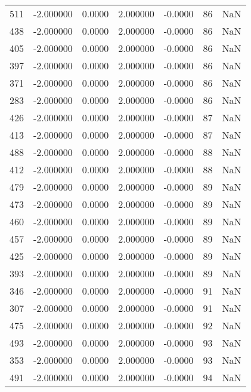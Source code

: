 \begin{tabular}{rrrrrrr}
511 &   -2.000000 &    0.0000 &    2.000000 &     -0.0000 &          86 & NaN \\
438 &   -2.000000 &    0.0000 &    2.000000 &     -0.0000 &          86 & NaN \\
405 &   -2.000000 &    0.0000 &    2.000000 &     -0.0000 &          86 & NaN \\
397 &   -2.000000 &    0.0000 &    2.000000 &     -0.0000 &          86 & NaN \\
371 &   -2.000000 &    0.0000 &    2.000000 &     -0.0000 &          86 & NaN \\
283 &   -2.000000 &    0.0000 &    2.000000 &     -0.0000 &          86 & NaN \\
426 &   -2.000000 &    0.0000 &    2.000000 &     -0.0000 &          87 & NaN \\
413 &   -2.000000 &    0.0000 &    2.000000 &     -0.0000 &          87 & NaN \\
488 &   -2.000000 &    0.0000 &    2.000000 &     -0.0000 &          88 & NaN \\
412 &   -2.000000 &    0.0000 &    2.000000 &     -0.0000 &          88 & NaN \\
479 &   -2.000000 &    0.0000 &    2.000000 &     -0.0000 &          89 & NaN \\
473 &   -2.000000 &    0.0000 &    2.000000 &     -0.0000 &          89 & NaN \\
460 &   -2.000000 &    0.0000 &    2.000000 &     -0.0000 &          89 & NaN \\
457 &   -2.000000 &    0.0000 &    2.000000 &     -0.0000 &          89 & NaN \\
425 &   -2.000000 &    0.0000 &    2.000000 &     -0.0000 &          89 & NaN \\
393 &   -2.000000 &    0.0000 &    2.000000 &     -0.0000 &          89 & NaN \\
346 &   -2.000000 &    0.0000 &    2.000000 &     -0.0000 &          91 & NaN \\
307 &   -2.000000 &    0.0000 &    2.000000 &     -0.0000 &          91 & NaN \\
475 &   -2.000000 &    0.0000 &    2.000000 &     -0.0000 &          92 & NaN \\
493 &   -2.000000 &    0.0000 &    2.000000 &     -0.0000 &          93 & NaN \\
353 &   -2.000000 &    0.0000 &    2.000000 &     -0.0000 &          93 & NaN \\
491 &   -2.000000 &    0.0000 &    2.000000 &     -0.0000 &          94 & NaN \\

\end{tabular}
